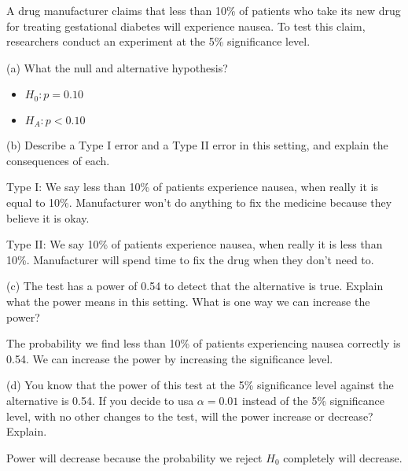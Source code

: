\documentclass[../stats.tex]{subfiles}
\begin{document}
\begin{example}
    A drug manufacturer claims that less than 10\% of patients who take its new drug for treating gestational diabetes will experience nausea. To test this claim, researchers conduct an experiment at the 5\% significance level.

    (a) What the null and alternative hypothesis?
    \begin{itemize}
        \item $H_0: p=0.10$
        \item $H_A: p<0.10$
    \end{itemize}

    (b) Describe a Type I error and a Type II error in this setting, and explain the consequences of each.

    Type I: We say less than 10\% of patients experience nausea, when really it is equal to 10\%. Manufacturer won't do anything to fix the medicine because they believe it is okay.

    Type II: We say 10\% of patients experience nausea, when really it is less than 10\%. Manufacturer will spend time to fix the drug when they don't need to.

    (c) The test has a power of 0.54 to detect that the alternative is true. Explain what the power means in this setting. What is one way we can increase the power?

    The probability we find less than 10\% of patients experiencing nausea correctly is 0.54. We can increase the power by increasing the significance level.

    (d) You know that the power of this test at the 5\% significance level against the alternative is 0.54. If you decide to usa $\alpha=0.01$ instead of the 5\% significance level, with no other changes to the test, will the power increase or decrease? Explain.

    Power will decrease because the probability we reject $H_0$ completely will decrease.
\end{example}
\end{document}
